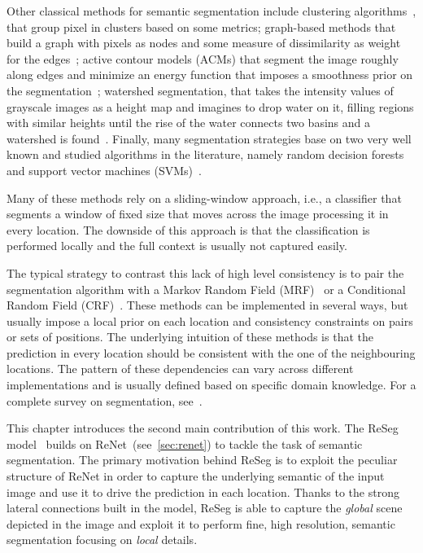 Other classical methods for semantic segmentation include clustering
algorithms~\citep[see e.g.,~][]{hartigan1975clustering,chen1998image}, that
group pixel in clusters based on some metrics; graph-based
methods that build a graph with pixels as nodes and some measure of
dissimilarity as weight for the edges~\citep[see e.g.,~][]{
carreira2010constrained,felzenszwalb2004efficient}; active contour models
(ACMs) that segment the image roughly along edges and minimize an energy
function that imposes a smoothness prior on the segmentation~\citep[see
e.g.,~][]{atkins1998fully,kass1988snakes}; watershed segmentation, that takes
the intensity values of grayscale images as a height map and imagines to drop
water on it, filling regions with similar heights until the rise of the water
connects two basins and a watershed is found~\citep[see e.g.,~][]{
roerdink2000watershed}. Finally, many segmentation strategies base on two very
well known and studied algorithms in the literature, namely random decision
forests~\citep{ho1995random,shotton2008semantic} and support vector machines
(SVMs)~\citep{burges1998tutorial,yang2012layered}.

Many of these methods rely on a sliding-window approach, i.e., a classifier
that segments a window of fixed size that moves across the image processing it
in every location. The downside of this approach is that the classification is
performed locally and the full context is usually not captured easily.

The typical strategy to contrast this lack of high level consistency is to pair
the segmentation algorithm with a Markov Random Field (MRF)~\citep[see
e.g.,~][]{ blake2011markov,MurphyBook2012,moser2012markov} or a Conditional
Random Field (CRF)~\citep[see e.g.,~][]{russell2009associative,
he2004multiscale, shotton2006textonboost}. These methods can be implemented in
several ways, but usually impose a local prior on each location and consistency
constraints on pairs or sets of positions. The underlying intuition of these
methods is that the prediction in every location should be consistent with the
one of the neighbouring locations. The pattern of these dependencies can vary
across different implementations and is usually defined based on specific
domain knowledge. For a complete survey on segmentation,
see~\citep{thoma2016survey}.

This chapter introduces the second main contribution of this work. The ReSeg
model~\citep{Visin_2016_CVPR_Workshops} builds on
ReNet~(see~\autoref{sec:renet}) to tackle the task of semantic segmentation.
The primary motivation behind ReSeg is to exploit the peculiar structure of
ReNet in order to capture the underlying semantic of the input image and use it
to drive the prediction in each location. Thanks to the strong lateral
connections built in the model, ReSeg is able to capture the \emph{global}
scene depicted in the image and exploit it to perform fine, high resolution,
semantic segmentation focusing on \emph{local} details.


